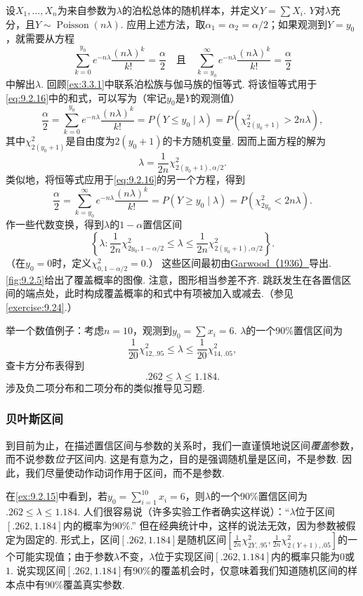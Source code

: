 \begin{example}[泊松区间估计量]\label{ex:9.2.15}
设$X_1,\ldots,X_n$为来自参数为$\lambda$的泊松总体的随机样本，并定义$Y=\sum X_i$. $Y$对$\lambda$充分，且$Y\sim\operatorname{Poisson}(n\lambda)$. 应用上述方法，取$\alpha_1=\alpha_2=\alpha/2$；如果观测到$Y=y_0$，就需要从方程
\begin{equation}\label{eq:9.2.16}
\sum_{k=0}^{y_0}e^{-n\lambda}\frac{(n\lambda)^k}{k!}=\frac\alpha2\quad\text{且}\quad\sum_{k=y_0}^\infty e^{-n\lambda}\frac{(n\lambda)^k}{k!}=\frac\alpha2
\end{equation}
中解出$\lambda$. 回顾\autoref{ex:3.3.1}中联系泊松族与伽马族的恒等式. 将该恒等式用于\eqref{eq:9.2.16}中的和式，可以写为（牢记$y_0$是$Y$的观测值）
$$\frac\alpha2=\sum_{k=0}^{y_0}e^{-n\lambda}\frac{(n\lambda)^k}{k!}=P(Y\le y_0\mid\lambda)=P(\chi^2_{2(y_0+1)}>2n\lambda),$$
其中$\chi^2_{2(y_0+1)}$是自由度为$2(y_0+1)$的卡方随机变量. 因而上面方程的解为
$$\lambda=\frac1{2n}\chi^2_{2(y_0+1),\alpha/2}.$$
类似地，将恒等式应用于\eqref{eq:9.2.16}的另一个方程，得到
$$\frac\alpha2=\sum_{k=y_0}^\infty e^{-n\lambda}\frac{(n\lambda)^k}{k!}=P(Y\ge y_0\mid\lambda)=P(\chi^2_{2y_0}<2n\lambda).$$
作一些代数变换，得到$\lambda$的$1-\alpha$置信区间
\begin{equation}\label{eq:9.2.17}
\left\{\lambda:\frac1{2n}\chi^2_{2y_0,1-\alpha/2}\le\lambda\le\frac1{2n}\chi^2_{2(y_0+1),\alpha/2}\right\}.
\end{equation}
（在$y_0=0$时，定义$\chi^2_{0,1-\alpha/2}=0$.）
这些区间最初由\hyperref[bib:source133]{Garwood（1936）}导出. \autoref{fig:9.2.5}给出了覆盖概率的图像. 注意，图形相当参差不齐. 跳跃发生在各置信区间的端点处，此时构成覆盖概率的和式中有项被加入或减去.（参见\autoref{exercise:9.24}.）

举一个数值例子：考虑$n=10$，观测到$y_0=\sum x_i=6$. $\lambda$的一个$90\%$置信区间为
$$\frac1{20}\chi^2_{12,.95}\le\lambda\le\frac1{20}\chi^2_{14,.05},$$
查卡方分布表得到
$$.262\le\lambda\le1.184.$$
涉及负二项分布和二项分布的类似推导见习题.
\end{example}
\subsubsection{贝叶斯区间}\label{sec:9.2.4}
到目前为止，在描述置信区间与参数的关系时，我们一直谨慎地说区间\emph{覆盖}参数，而不说参数\emph{位于}区间内. 这是有意为之，目的是强调随机量是区间，不是参数. 因此，我们尽量使动作动词作用于区间，而不是参数.

在\autoref{ex:9.2.15}中看到，若$y_0=\sum_{i=1}^{10}x_i=6$，则$\lambda$的一个$90\%$置信区间为$.262\le\lambda\le1.184$. 人们很容易说（许多实验工作者确实这样说）：“$\lambda$位于区间$[.262,1.184]$内的概率为$90\%$.” 但在经典统计中，这样的说法无效，因为参数被假定为固定的. 形式上，区间$[.262,1.184]$是随机区间$[\frac1{2n}\chi^2_{2Y,.95},\frac1{2n}\chi^2_{2(Y+1),.05}]$的一个可能实现值；由于参数$\lambda$不变，$\lambda$位于实现区间$[.262,1.184]$内的概率只能为$0$或$1$. 说实现区间$[.262,1.184]$有$90\%$的覆盖机会时，仅意味着我们知道随机区间的样本点中有$90\%$覆盖真实参数.

